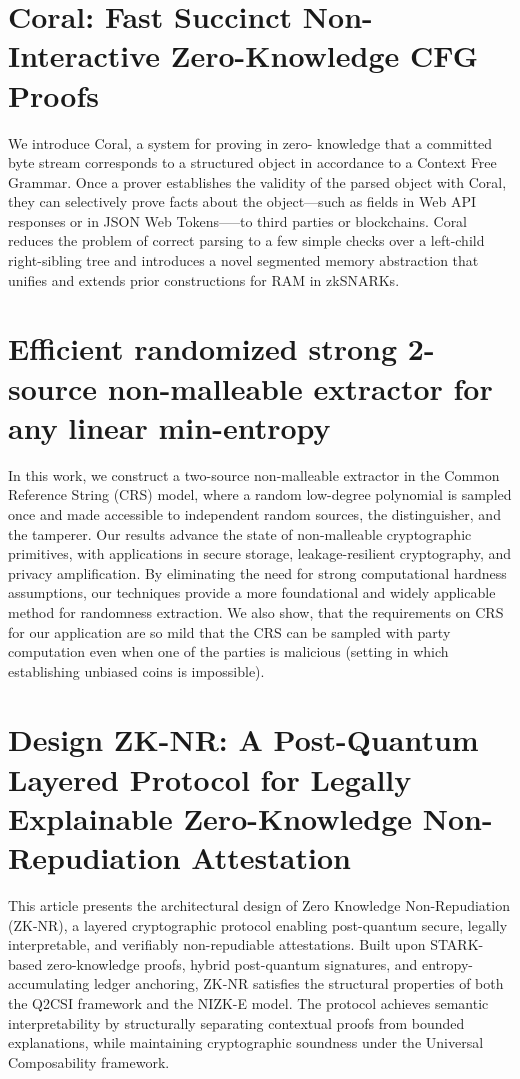 \documentclass[11pt]{article}
\theoremstyle{definition}
\theoremstyle{remark}
\theoremstyle{plain}
\begin{document}
\section{\cite{cryptoeprint:2025/1420} Coral: Fast Succinct Non-Interactive Zero-Knowledge CFG Proofs}
We introduce Coral, a system for proving in zero-
knowledge that a committed byte stream corresponds to a
structured object in accordance to a Context Free Grammar.
Once a prover establishes the validity of the parsed object with Coral, they can selectively prove facts about the object—such as fields in Web API responses or in JSON Web Tokens—–to third
parties or blockchains. Coral reduces the problem of correct
parsing to a few simple checks over a left-child right-sibling tree and introduces a novel segmented memory abstraction that
unifies and extends prior constructions for RAM in zkSNARKs.

\section{\cite{cryptoeprint:2025/1421} Efficient randomized strong 2-source non-malleable extractor for any linear min-entropy}
In this work, we construct a two-source non-malleable extractor in the Common Reference String (CRS) model, where a random low-degree polynomial is sampled once and made accessible to independent random sources, the distinguisher, and the tamperer.
Our results advance the state of non-malleable cryptographic primitives, with applications in secure storage, leakage-resilient cryptography, and privacy amplification. By eliminating the need for strong computational hardness assumptions, our techniques provide a more foundational and widely applicable method for randomness extraction.
We also show, that the requirements on CRS for our application are so mild that the CRS can be sampled with 
 party computation even when one of the parties is malicious (setting in which establishing unbiased coins is impossible).
\section{\cite{cryptoeprint:2025/1422} Design ZK-NR: A Post-Quantum Layered Protocol for Legally Explainable Zero-Knowledge Non-Repudiation Attestation}
This article presents the architectural design of Zero Knowledge Non-Repudiation (ZK-NR), a layered cryptographic protocol enabling post-quantum secure, legally interpretable, and verifiably non-repudiable attestations. Built upon STARK-based zero-knowledge proofs, hybrid post-quantum signatures, and entropy-accumulating ledger anchoring, ZK-NR satisfies the structural properties of both the Q2CSI framework and the NIZK-E model. The protocol achieves semantic interpretability by structurally separating contextual proofs from bounded explanations, while maintaining cryptographic soundness under the Universal Composability framework. 
\end{document}
